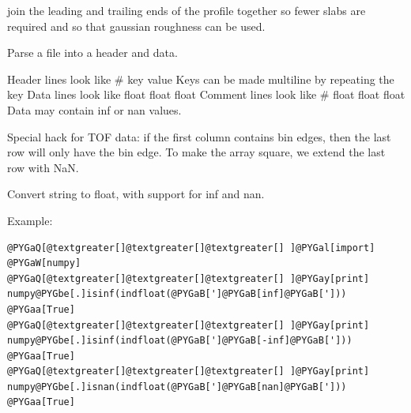 \documentclass[letterpaper,10pt,english]{sphinxmanual}
\begin{document}
\label{api/util:module-refl1d.util}

\begin{fulllineitems}
\label{api/util:refl1d.util.merge_ends}
join the leading and trailing ends of the profile together so fewer
slabs are required and so that gaussian roughness can be used.

\end{fulllineitems}


\begin{fulllineitems}
\label{api/util:refl1d.util.parse_file}
Parse a file into a header and data.

Header lines look like \# key value
Keys can be made multiline by repeating the key
Data lines look like float float float
Comment lines look like \# float float float
Data may contain inf or nan values.

Special hack for TOF data: if the first column contains bin edges, then
the last row will only have the bin edge.  To make the array square,
we extend the last row with NaN.

\end{fulllineitems}


\begin{fulllineitems}
\label{api/util:refl1d.util.indfloat}
Convert string to float, with support for inf and nan.

Example:

\begin{Verbatim}[commandchars=@\[\]]
@PYGaQ[@textgreater[]@textgreater[]@textgreater[] ]@PYGal[import] @PYGaW[numpy]
@PYGaQ[@textgreater[]@textgreater[]@textgreater[] ]@PYGay[print] numpy@PYGbe[.]isinf(indfloat(@PYGaB[']@PYGaB[inf]@PYGaB[']))
@PYGaa[True]
@PYGaQ[@textgreater[]@textgreater[]@textgreater[] ]@PYGay[print] numpy@PYGbe[.]isinf(indfloat(@PYGaB[']@PYGaB[-inf]@PYGaB[']))
@PYGaa[True]
@PYGaQ[@textgreater[]@textgreater[]@textgreater[] ]@PYGay[print] numpy@PYGbe[.]isnan(indfloat(@PYGaB[']@PYGaB[nan]@PYGaB[']))
@PYGaa[True]
\end{Verbatim}

\end{fulllineitems}
\end{document}
